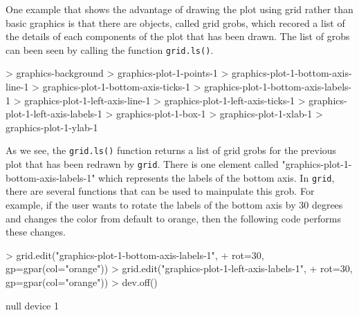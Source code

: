 \documentclass[a4paper,10pt]{article}
\begin{document}
\newpage
One example that shows the advantage of drawing the plot using grid rather than basic graphics is that there are objects, called grid grobs, which recored a list of the details of each components of the plot that has been drawn. The list of grobs can been seen by calling the function \texttt{grid.ls()}. \\
\begin{Schunk}
\begin{Sinput}
> graphics-background
> graphics-plot-1-points-1
> graphics-plot-1-bottom-axis-line-1
> graphics-plot-1-bottom-axis-ticks-1
> graphics-plot-1-bottom-axis-labels-1
> graphics-plot-1-left-axis-line-1
> graphics-plot-1-left-axis-ticks-1
> graphics-plot-1-left-axis-labels-1
> graphics-plot-1-box-1
> graphics-plot-1-xlab-1
> graphics-plot-1-ylab-1
\end{Sinput}
\end{Schunk}

As we see, the \texttt{grid.ls()} function returns a list of grid grobs for the previous plot that has been redrawn by \texttt{grid}. There is one element called "graphics-plot-1-bottom-axis-labels-1" which represents the labels of the bottom axis. In \texttt{grid}, there are several functions that can be used to mainpulate this grob. For example, if the user wants to rotate the labels of the bottom axis by 30 degrees and changes the color from default to orange, then the following code performs these changes.


\begin{Schunk}
\begin{Sinput}
> grid.edit("graphics-plot-1-bottom-axis-labels-1", 
+           rot=30, gp=gpar(col="orange"))
> grid.edit("graphics-plot-1-left-axis-labels-1", 
+           rot=30, gp=gpar(col="orange"))
> dev.off()
\end{Sinput}
\begin{Soutput}
null device 
          1 
\end{Soutput}
\end{Schunk}
\end{document}
